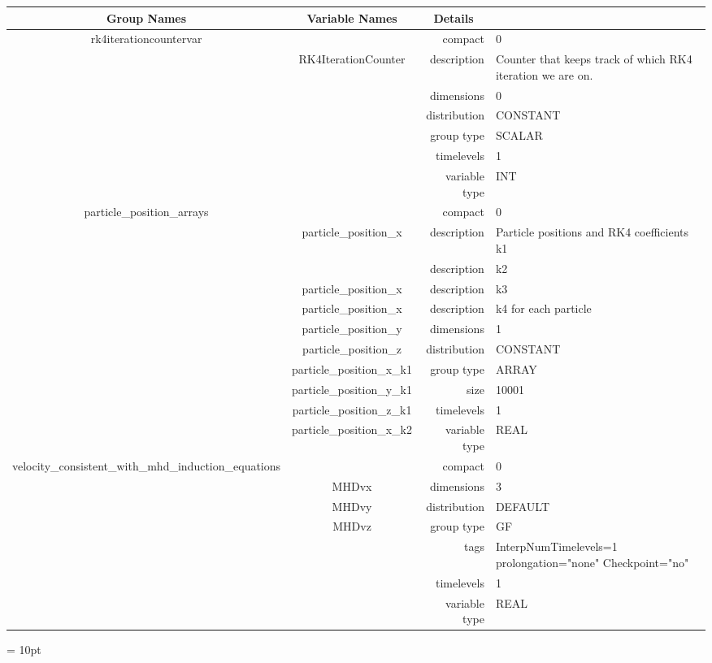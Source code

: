 \begin{tabular*}{150mm}{|c|c@{\extracolsep{\fill}}|rl|} \hline 
~ {\bf Group Names} ~ & ~ {\bf Variable Names} ~  &{\bf Details} ~ & ~\\ 
\hline 
rk4iterationcountervar &  & compact & 0 \\ 
 & RK4IterationCounter & description & Counter that keeps track of which RK4 iteration we are on. \\ 
 &  & dimensions & 0 \\ 
 &  & distribution & CONSTANT \\ 
 &  & group type & SCALAR \\ 
 &  & timelevels & 1 \\ 
 &  & variable type & INT \\ 
\hline 
particle\_position\_arrays &  & compact & 0 \\ 
 & particle\_position\_x & description & Particle positions and RK4 coefficients k1 \\ 
& ~ & description & k2 \\ 
 & particle\_position\_x & description & k3 \\ 
 & particle\_position\_x & description & k4 for each particle \\ 
 & particle\_position\_y & dimensions & 1 \\ 
 & particle\_position\_z & distribution & CONSTANT \\ 
 & particle\_position\_x\_k1 & group type & ARRAY \\ 
 & particle\_position\_y\_k1 & size & 10001 \\ 
 & particle\_position\_z\_k1 & timelevels & 1 \\ 
 & particle\_position\_x\_k2 & variable type & REAL \\ 
\hline 
velocity\_consistent\_with\_mhd\_induction\_equations &  & compact & 0 \\ 
 & MHDvx & dimensions & 3 \\ 
 & MHDvy & distribution & DEFAULT \\ 
 & MHDvz & group type & GF \\ 
 &  & tags & InterpNumTimelevels=1 prolongation="none" Checkpoint="no" \\ 
 &  & timelevels & 1 \\ 
 &  & variable type & REAL \\ 
\hline 
\end{tabular*} 



\vspace{5mm}\parskip = 10pt 
